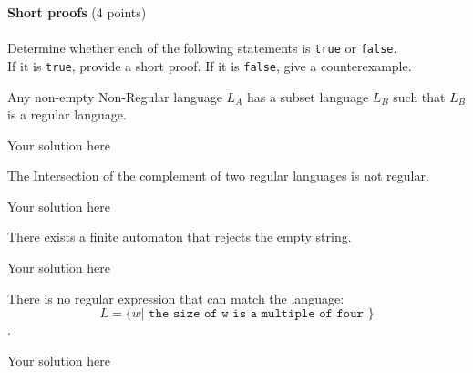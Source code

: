 \documentclass[12pt]{article}
\newenvironment{question}[2][Question]{\begin{trivlist}
\item[\hskip \labelsep {\bfseries #1}\hskip \labelsep {\bfseries #2.}]}{\end{trivlist}}
\newenvironment{solution}[1][Solution:]{\begin{trivlist}
\item[\hskip \labelsep {\bfseries #1}\hskip \labelsep {\bfseries}]\color{blue}}{\end{trivlist}}
\begin{document}
\begin{question}{5}\textbf{Short proofs} (4 points)\\\\
Determine whether each of the following statements is \texttt{true} or \texttt{false}.\\ If it is \texttt{true}, provide a short proof. If it is \texttt{false}, give a counterexample.
\begin{enumerate}[(a)]

 \item Any non-empty Non-Regular language $L_{A}$ has a subset language $L_{B}$ such that $L_{B}$ is a regular language. 

     \begin{solution}
       Your solution here
    \end{solution}


\item The Intersection of the complement of two regular languages is not regular.

    \begin{solution}
       Your solution here
    \end{solution}


\item There exists a finite automaton that rejects the empty string.

    \begin{solution}
       Your solution here
    \end{solution}


\item There is no regular expression that can match the language:
$$ L=\{ w | \texttt{ the size of w is a multiple of four } \}$$.
 \\ \; 

     \begin{solution}
       Your solution here
    \end{solution}
    
\end{enumerate}
\end{question}


\newpage


\end{document}
